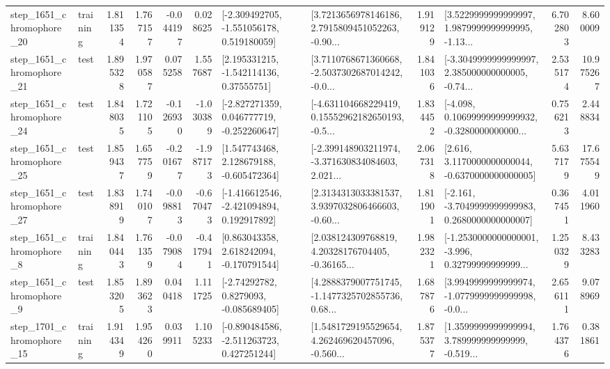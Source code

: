 \begin{tabular}{llrrrrllrlrr}
 step\_1651\_chromophore\_20 &  training &      1.811354 &    1.767157 &     -0.044197 &  0.028625 &   [-2.309492705, -1.551056178, 0.519180059] &  [3.7213656978146186, 2.7915809451052263, -0.90... &       1.919129 &  [3.5229999999999997, 1.9879999999999995, -1.13... &            6.702803 &          8.600009 \\
 step\_1651\_chromophore\_21 &      test &      1.895328 &    1.970587 &      0.075258 &  1.557687 &     [2.195331215, -1.542114136, 0.37555751] &  [3.7110768671360668, -2.5037302687014242, -0.0... &       1.841036 &  [-3.3049999999999997, 2.385000000000005, -0.74... &            2.535174 &         10.975267 \\
 step\_1651\_chromophore\_24 &      test &      1.848035 &    1.721105 &     -0.126930 & -1.030389 &   [-2.827271359, 0.046777719, -0.252260647] &  [-4.631104668229419, 0.15552962182650193, -0.5... &       1.834452 &  [-4.098, 0.10699999999999932, -0.3280000000000... &            0.756213 &          2.448834 \\
 step\_1651\_chromophore\_25 &      test &      1.859437 &    1.657759 &     -0.201677 & -1.987173 &    [1.547743468, 2.128679188, -0.605472364] &  [-2.399148903211974, -3.371630834084603, 2.021... &       2.067318 &   [2.616, 3.1170000000000044, -0.6370000000000005] &            5.637179 &         17.675549 \\
 step\_1651\_chromophore\_27 &      test &      1.838919 &    1.740107 &     -0.098813 & -0.670473 &   [-1.416612546, -2.421094894, 0.192917892] &  [2.3134313033381537, 3.9397032806466603, -0.60... &       1.811901 &  [-2.161, -3.7049999999999983, 0.2680000000000007] &            0.367451 &          4.011960 \\
  step\_1651\_chromophore\_8 &  training &      1.840443 &    1.761359 &     -0.079084 & -0.417941 &    [0.863043358, 2.618242094, -0.170791544] &  [2.038124309768819, 4.20328176704405, -0.36165... &       1.982321 &  [-1.2530000000000001, -3.996, 0.32799999999999... &            1.250329 &          8.433283 \\
  step\_1651\_chromophore\_9 &      test &      1.853205 &    1.893623 &      0.040418 &  1.111725 &      [-2.74292782, 0.8279093, -0.085689405] &  [4.2888379007751745, -1.1477325702855736, 0.68... &       1.687876 &  [3.9949999999999974, -1.0779999999999998, -0.0... &            2.656111 &          9.078969 \\
 step\_1701\_chromophore\_15 &  training &      1.914349 &    1.954260 &      0.039911 &  1.105233 &   [-0.890484586, -2.511263723, 0.427251244] &  [1.5481729195529654, 4.262469620457096, -0.560... &       1.875377 &  [1.3599999999999994, 3.789999999999999, -0.519... &            1.764376 &          0.381861 \\

\end{tabular}
